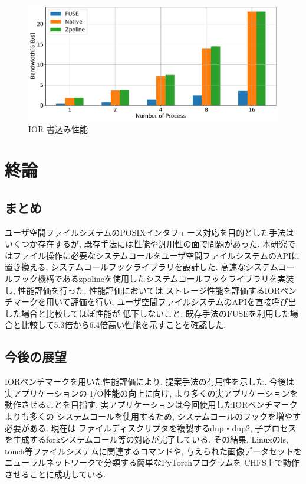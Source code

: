 \documentclass[a4paper,11pt]{jreport}
\begin{document}
\begin{figure}[h]
    \begin{minipage}[b]{1\columnwidth}
		\centering
		\includegraphics[width=0.9\linewidth]{./figure/ior_benchmark_write.pdf}
		\caption{IOR 書込み性能}
		\label{fig:Evaluation write}
	\end{minipage}
\end{figure}

\chapter{終論}
\section{まとめ}
ユーザ空間ファイルシステムのPOSIXインタフェース対応を目的とした手法はいくつか存在するが, 既存手法には性能や汎用性の面で問題があった.
本研究ではファイル操作に必要なシステムコールをユーザ空間ファイルシステムのAPIに置き換える, システムコールフックライブラリを設計した.
高速なシステムコールフック機構であるzpolineを使用したシステムコールフックライブラリを実装し, 性能評価を行った. 性能評価においては
ストレージ性能を評価するIORベンチマークを用いて評価を行い, ユーザ空間ファイルシステムのAPIを直接呼び出した場合と比較してほぼ性能が
低下しないこと, 既存手法のFUSEを利用した場合と比較して5.3倍から6.4倍高い性能を示すことを確認した.

\section{今後の展望}
IORベンチマークを用いた性能評価により, 提案手法の有用性を示した. 今後は実アプリケーションの
I/O性能の向上に向け, より多くの実アプリケーションを動作させることを目指す. 実アプリケーションは今回使用したIORベンチマークよりも多くの
システムコールを使用するため, システムコールのフックを増やす必要がある. 現在は
ファイルディスクリプタを複製するdup・dup2, 子プロセスを生成するforkシステムコール等の対応が完了している. その結果, Linuxのls, 
touch等ファイルシステムに関連するコマンドや, 与えられた画像データセットをニューラルネットワークで分類する簡単なPyTorchプログラムを
CHFS上で動作させることに成功している. 
\end{document}
